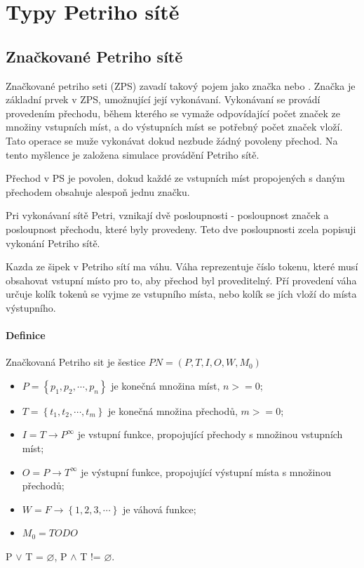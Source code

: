\section{Typy Petriho sítě}

\subsection{Značkované Petriho sítě}
Značkované petriho seti (ZPS) zavadí takový pojem jako značka nebo . Značka je základní prvek v ZPS, umožnující její vykonávaní. Vykonávaní se provádí provedením přechodu, během kterého se vymaže odpovídající počet značek ze množiny vstupních míst, a do výstupních míst se potřebný počet značek vloží. Tato operace se muže vykonávat dokud nezbude žádný povoleny přechod. Na tento myšlence je založena simulace provádění Petriho sítě.

Přechod v PS je povolen, dokud každé ze vstupních míst propojených s daným přechodem obsahuje alespoň jednu značku.

Pri vykonávaní sítě Petri, vznikají dvě posloupnosti - posloupnost značek a posloupnost přechodu, které byly provedeny. Teto dve posloupnosti zcela popisuji vykonání Petriho sítě.

Kazda ze šipek v Petriho sítí ma váhu. Váha reprezentuje číslo tokenu, které musí obsahovat vstupní místo pro to, aby přechod byl proveditelný. Pří provedení váha určuje kolík tokenů se vyjme ze vstupního místa, nebo kolík se jích vloží do místa výstupního.

\paragraph{Definice}

Značkovaná Petriho sit je šestice $PN = \left(P, T, I, O, W, M_0\right)$
\begin{itemize}
  \item $P = \left\{p_1, p_2, \cdots , p_n\right\}$ je konečná množina míst, $n >= 0$; \\
  \item $T = \left\{t_1, t_2, \cdots , t_m\right\}$ je konečná množina přechodů, $m >= 0$; \\
  \item $I = T \rightarrow P^\infty$ je vstupní funkce, propojující přechody s množinou vstupních míst; \\
  \item $O = P \rightarrow T^\infty$ je výstupní funkce, propojující výstupní místa s množinou přechodů; \\
  \item $W = F \rightarrow \left\{1, 2, 3, \cdots \right\}$ je váhová funkce;
  \item $M_0 = TODO$
\end{itemize}
P $\vee$ T = $\varnothing$, P $\wedge$ T != $\varnothing$.

